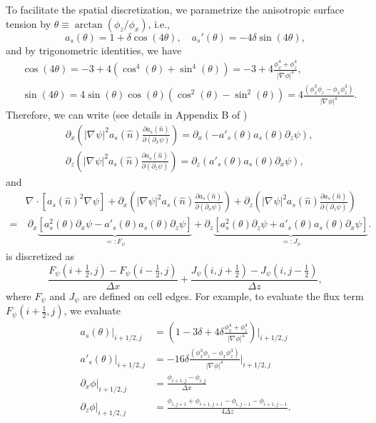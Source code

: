 \documentclass[final,times]{elsarticle}
\numberwithin{equation}{section}
\renewcommand{\div}[1]{\nabla_{#1} \cdot}
\newcommand{\grad}[1]{\nabla_{#1}}
\begin{document}
To facilitate the spatial discretization, we parametrize the anisotropic surface tension by $\theta \equiv \arctan(\phi_z / \phi_x)$, i.e., 
\begin{equation}
a_s(\theta)=  1 + \delta \cos(4 \theta) , \quad a_s'(\theta) = -4 \delta \sin(4\theta),
\end{equation}
and by trigonometric identities, we have 
\begin{align}
& \cos(4\theta) = -3  + 4 ( \cos^4(\theta) + \sin^4(\theta) ) = -3 +  4 \frac{ \phi_x^4 +  \phi_z^4 }{|\grad{} \phi|^4} ,  \\
& \sin(4\theta) = 4 \sin(\theta) \cos(\theta) ( \cos^2(\theta) - \sin^2(\theta)) = 4 \frac{(\phi_x^3 \phi_z - \phi_x \phi_z^3 )}{|\grad{} \phi|^4}.
\end{align}
Therefore, we can write (see details in Appendix B of \cite{Tourret2015})
\begin{align}
& \partial_x \left( |\grad{} \psi|^2 a_s(\hat{n}) \frac{\partial a_s(\hat{n})}{\partial (\partial_x \psi)}  \right) = \partial_x (-a'_s(\theta) a_s(\theta) \partial_z \psi ), \\
& \partial_z \left( |\grad{} \psi|^2 a_s(\hat{n}) \frac{\partial a_s(\hat{n})}{\partial (\partial_z \psi)}  \right) = 
\partial_z (a'_s(\theta) a_s(\theta) \partial_x \psi),
\end{align}
and 
\begin{align}
 & \div{} [a_s(\hat{n})^2 \grad{} \psi] +  \partial_x \left( |\grad{} \psi|^2 a_s(\hat{n}) \frac{\partial a_s(\hat{n})}{\partial (\partial_x \psi)}  \right)  +
\partial_z \left( |\grad{} \psi|^2 a_s(\hat{n}) \frac{\partial a_s(\hat{n})}{\partial (\partial_z \psi)}  \right) \nonumber \\
= &  \  \partial_x  \underbrace{ \left[ a_s^2(\theta) \partial_x \psi - a'_s(\theta) a_s(\theta) \partial_z \psi \right]}_{=: F_{\psi}} + 
\partial_z \underbrace{ \left[ a_s^2(\theta) \partial_z \psi + a'_s(\theta) a_s(\theta) \partial_x \psi \right]}_{=: J_{\psi}}  .
\label{eq:aniso_surf2}
\end{align}
 is discretized as
\begin{equation}
\frac{F_{\psi}(i+\frac{1}{2}, j) - F_{\psi}(i-\frac{1}{2},j)}{\Delta x} + \frac{J_{\psi}(i,j+\frac{1}{2})-J_{\psi}(i,j-\frac{1}{2})}{\Delta z},
\end{equation}
where $F_{\psi}$ and $J_{\psi}$ are defined on cell edges. For example, to evaluate the flux term $F_{\psi}(i+\frac{1}{2},j)$, we evaluate
\begin{align}
a_s(\theta) \big|_{i+1/2,j} &= \left( 1-3\delta + 4\delta  \frac{\phi_x^4 +  \phi_z^4}{|\grad{} \phi|^4} \right)\bigg|_{i+1/2,j} \\
a'_s(\theta) \big|_{i+1/2,j} &= -16\delta  \frac{(\phi_x^3 \phi_z- \phi_x \phi_z^3 )}{|\grad{} \phi|^4} \bigg|_{i+1/2,j} \\
\partial_x \phi \big|_{i+1/2,j} &= \frac{\phi_{i+1,j}-\phi_{i,j}}{\Delta x} \\
\partial_z \phi \big|_{i+1/2,j}  &= \frac{\phi_{i,j+1}+\phi_{i+1,j+1}-\phi_{i,j-1}-\phi_{i+1,j-1}}{4\Delta z}.
\end{align}
\end{document}
